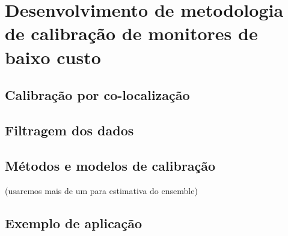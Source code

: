 \chapter{Desenvolvimento de metodologia de calibração de monitores de baixo custo}\label{cap:field-monit-results}

\section{Calibração por co-localização}

\section{Filtragem dos dados}

\section{Métodos e modelos de calibração}

(usaremos mais de um para estimativa do ensemble)

\section{Exemplo de aplicação}